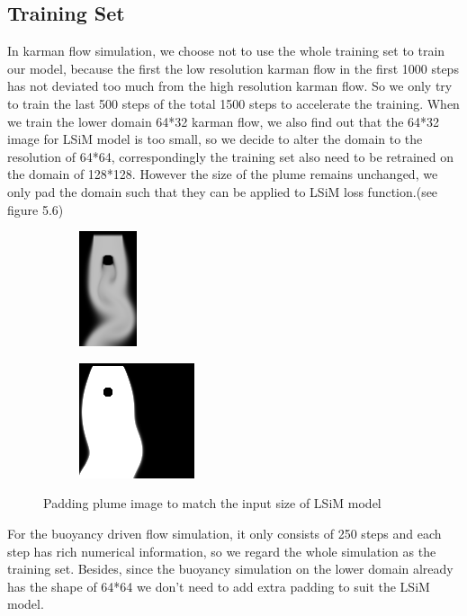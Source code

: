 \documentclass[a4paper,12pt,twoside]{report}
\begin{document}
\subsection{Training Set}
In karman flow simulation, we choose not to use the whole training set to train our model, because the first the low resolution karman flow in the first 1000 steps has not deviated too much from the high resolution karman flow. So we only try to train the last 500 steps of the total 1500 steps to accelerate the training. When we train the lower domain 64*32 karman flow, we also find out that the 64*32 image for LSiM model is too small, so we decide to alter the domain to the resolution of 64*64, correspondingly the training set also need to be retrained on the domain of 128*128. However the size of the plume remains unchanged, we only pad the domain such that they can be applied to LSiM loss function.(see figure 5.6)
\begin{figure}
\centering
\begin{subfigure}{0.4\textwidth}
  \centering
  \includegraphics[scale=1]{nonpad_karmanflow.png}
  \caption{}
\end{subfigure}
\begin{subfigure}{0.4\textwidth}
  \centering
  \includegraphics[scale=1]{pad_karmanflow.png}
  \caption{}
\end{subfigure}
\caption{Padding plume image to match the input size of LSiM model}
\end{figure}
For the buoyancy driven flow simulation, it only consists of 250 steps and each step has rich numerical information, so we regard the whole simulation as the training set. Besides, since the buoyancy simulation on the lower domain already has the shape of 64*64 we don't need to add extra padding to suit the LSiM model.
\end{document}
